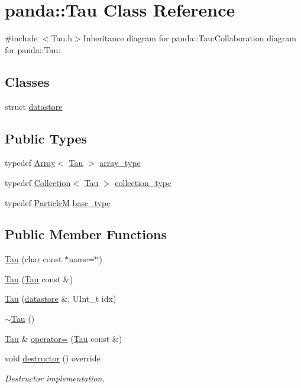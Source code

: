 \hypertarget{classpanda_1_1Tau}{
\section{panda::Tau Class Reference}
\label{classpanda_1_1Tau}
}


{\ttfamily \#include $<$Tau.h$>$}Inheritance diagram for panda::Tau:Collaboration diagram for panda::Tau:\subsection*{Classes}
\begin{DoxyCompactItemize}
\item 
struct \hyperlink{structpanda_1_1Tau_1_1datastore}{datastore}
\end{DoxyCompactItemize}
\subsection*{Public Types}
\begin{DoxyCompactItemize}
\item 
typedef \hyperlink{classpanda_1_1Array}{Array}$<$ \hyperlink{classpanda_1_1Tau}{Tau} $>$ \hyperlink{classpanda_1_1Tau_a74a1cb1b70bdd2212670492156eecc50}{array\_\-type}
\item 
typedef \hyperlink{classpanda_1_1Collection}{Collection}$<$ \hyperlink{classpanda_1_1Tau}{Tau} $>$ \hyperlink{classpanda_1_1Tau_a4998ea28667acf331fa5dd9e9decdcda}{collection\_\-type}
\item 
typedef \hyperlink{classpanda_1_1ParticleM}{ParticleM} \hyperlink{classpanda_1_1Tau_aeeec56f6b40c4aa834d50e298430fdb4}{base\_\-type}
\end{DoxyCompactItemize}
\subsection*{Public Member Functions}
\begin{DoxyCompactItemize}
\item 
\hyperlink{classpanda_1_1Tau_a0b631016b750156f75c540643f0a1dba}{Tau} (char const $\ast$name=\char`\"{}\char`\"{})
\item 
\hyperlink{classpanda_1_1Tau_ae8c55cd74106fdc7513d24fa92ef1b2b}{Tau} (\hyperlink{classpanda_1_1Tau}{Tau} const \&)
\item 
\hyperlink{classpanda_1_1Tau_a435fada7333cc9a2cd51d051fe013aef}{Tau} (\hyperlink{structpanda_1_1Element_1_1datastore}{datastore} \&, UInt\_\-t idx)
\item 
\hyperlink{classpanda_1_1Tau_a3b9ea8c485a97fc1830810d5d111446a}{$\sim$Tau} ()
\item 
\hyperlink{classpanda_1_1Tau}{Tau} \& \hyperlink{classpanda_1_1Tau_a1482f04be4fffde6b5c648ae3e7b539f}{operator=} (\hyperlink{classpanda_1_1Tau}{Tau} const \&)
\item 
void \hyperlink{classpanda_1_1Tau_a7caf1a64e1c468e27a6a88c34ab97457}{destructor} () override
\begin{DoxyCompactList}\small\item\em Destructor implementation. \item\end{DoxyCompactList}\end{DoxyCompactItemize}
